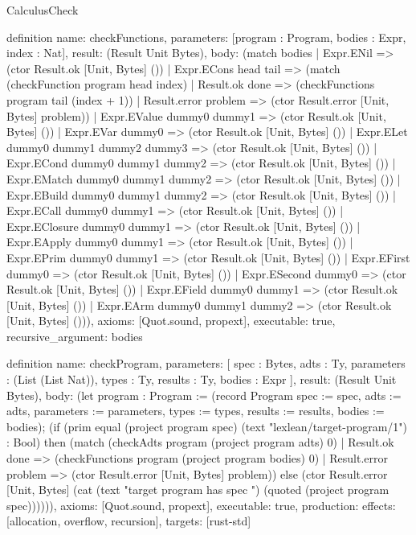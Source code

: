 \begin{lexlean}{CalculusCheck}
\begin{semanticmodule}
definition{
  name: checkFunctions,
  parameters: [program : Program, bodies : Expr, index : Nat],
  result: (Result Unit Bytes),
  body: (match bodies
    | Expr.ENil => (ctor Result.ok [Unit, Bytes] ())
    | Expr.ECons head tail => (match (checkFunction program head index)
      | Result.ok done => (checkFunctions program tail (index + 1))
      | Result.error problem => (ctor Result.error [Unit, Bytes] problem))
    | Expr.EValue dummy0 dummy1 => (ctor Result.ok [Unit, Bytes] ())
    | Expr.EVar dummy0 => (ctor Result.ok [Unit, Bytes] ())
    | Expr.ELet dummy0 dummy1 dummy2 dummy3 => (ctor Result.ok [Unit, Bytes] ())
    | Expr.ECond dummy0 dummy1 dummy2 => (ctor Result.ok [Unit, Bytes] ())
    | Expr.EMatch dummy0 dummy1 dummy2 => (ctor Result.ok [Unit, Bytes] ())
    | Expr.EBuild dummy0 dummy1 dummy2 => (ctor Result.ok [Unit, Bytes] ())
    | Expr.ECall dummy0 dummy1 => (ctor Result.ok [Unit, Bytes] ())
    | Expr.EClosure dummy0 dummy1 => (ctor Result.ok [Unit, Bytes] ())
    | Expr.EApply dummy0 dummy1 => (ctor Result.ok [Unit, Bytes] ())
    | Expr.EPrim dummy0 dummy1 => (ctor Result.ok [Unit, Bytes] ())
    | Expr.EFirst dummy0 => (ctor Result.ok [Unit, Bytes] ())
    | Expr.ESecond dummy0 => (ctor Result.ok [Unit, Bytes] ())
    | Expr.EField dummy0 dummy1 => (ctor Result.ok [Unit, Bytes] ())
    | Expr.EArm dummy0 dummy1 dummy2 => (ctor Result.ok [Unit, Bytes] ())),
  axioms: [Quot.sound, propext],
  executable: true,
  recursive_argument: bodies
}

definition{
  name: checkProgram,
  parameters: [
    spec : Bytes,
    adts : Ty,
    parameters : (List (List Nat)),
    types : Ty,
    results : Ty,
    bodies : Expr
  ],
  result: (Result Unit Bytes),
  body: (let program : Program := (record Program {spec := spec, adts := adts, parameters := parameters, types := types, results := results, bodies := bodies}); (if (prim equal (project program spec) (text "lexlean/target-program/1") : Bool) then (match (checkAdts program (project program adts) 0)
    | Result.ok done => (checkFunctions program (project program bodies) 0)
    | Result.error problem => (ctor Result.error [Unit, Bytes] problem)) else (ctor Result.error [Unit, Bytes] (cat (text "target program has spec ") (quoted (project program spec)))))),
  axioms: [Quot.sound, propext],
  executable: true,
  production: {effects: [allocation, overflow, recursion], targets: [rust-std]}
}


\end{semanticmodule}
\end{lexlean}
